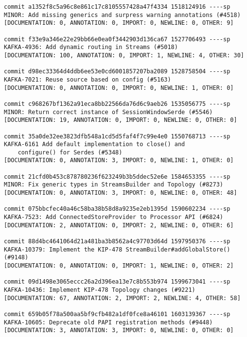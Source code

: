 \begin{mdframed}
\begin{lstlisting}
commit a1352f8c5a96c8e861c17c8105557428a47f4334 1518124916 ----sp 
MINOR: Add missing generics and surpress warning annotations (#4518)                                 
[DOCUMENTATION: 0, ANNOTATION: 0, IMPORT: 0, NEWLINE: 0, OTHER: 9]

commit f33e9a346e22e29bb66e0ea0f3442903d136ca67 1527706493 ----sp 
KAFKA-4936: Add dynamic routing in Streams (#5018)                                                   
[DOCUMENTATION: 100, ANNOTATION: 0, IMPORT: 1, NEWLINE: 4, OTHER: 30]

commit d98ec33364d4ddb6ee53e0cd6001857207ba2089 1528758504 ----sp 
KAFKA-7021: Reuse source based on config (#5163)                                                     
[DOCUMENTATION: 0, ANNOTATION: 0, IMPORT: 0, NEWLINE: 1, OTHER: 0]

commit c968267bf1362a91eca8bb22566da76d6c9aeb26 1535056775 ----sp 
MINOR: Return correct instance of SessionWindowSerde (#5546)                                         
[DOCUMENTATION: 19, ANNOTATION: 0, IMPORT: 0, NEWLINE: 0, OTHER: 0]

commit 35a0de32ee3823dfb548a1cd5d5faf4f7c99e4e0 1550768713 ----sp 
KAFKA-6161 Add default implementation to close() and 
    configure() for Serdes (#5348)
[DOCUMENTATION: 0, ANNOTATION: 3, IMPORT: 0, NEWLINE: 1, OTHER: 0]

commit 21cfd0b453c878780236f623249b3b5ddec52e6e 1584653355 ----sp 
MINOR: Fix generic types in StreamsBuilder and Topology (#8273)                                      
[DOCUMENTATION: 0, ANNOTATION: 3, IMPORT: 0, NEWLINE: 0, OTHER: 48]

commit 075bbcfec40a46c58ba38b58d8a9235e2eb1395d 1590602234 ----sp 
KAFKA-7523: Add ConnectedStoreProvider to Processor API (#6824)                                      
[DOCUMENTATION: 2, ANNOTATION: 0, IMPORT: 2, NEWLINE: 0, OTHER: 6]

commit 88d4bc4641064d21a481ba3b8562a4c97703d64d 1597950376 ----sp 
KAFKA-10379: Implement the KIP-478 StreamBuilder#addGlobalStore() (#9148)
[DOCUMENTATION: 0, ANNOTATION: 0, IMPORT: 1, NEWLINE: 0, OTHER: 2]

commit 09d1498e3065eccc26a2d396ea13e7c8b553b974 1599673041 ----sp 
KAFKA-10436: Implement KIP-478 Topology changes (#9221)                                              
[DOCUMENTATION: 67, ANNOTATION: 2, IMPORT: 2, NEWLINE: 4, OTHER: 58]

commit 659b05f78a500aa5bf9cfb482a1df0fce8a46101 1603139367 ----sp 
KAFKA-10605: Deprecate old PAPI registration methods (#9448)                                         
[DOCUMENTATION: 3, ANNOTATION: 3, IMPORT: 0, NEWLINE: 0, OTHER: 0]


\end{lstlisting}
\end{mdframed}
